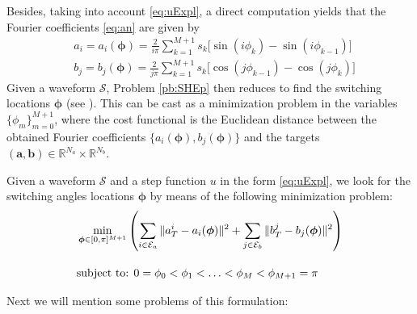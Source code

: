 Besides, taking into account \eqref{eq:uExpl}, a direct computation yields that the Fourier coefficients \eqref{eq:an} are given by
\begin{align*}
	& a_i = a_i(\bm{\phi}) =  \frac{2}{i\pi} \sum_{k=1}^{M+1} s_k \Big[\sin(i\phi_k) -\sin(i\phi_{k-1})\Big]
	\\
	& b_j = b_j(\bm{\phi}) = \frac{2}{j\pi} \sum_{k=1}^{M+1} s_k \Big[\cos(j\phi_{k-1}) -\cos(j\phi_{k})\Big]
\end{align*}
Given a waveform $\mathcal S$, Problem \ref{pb:SHEp} then reduces to find the switching locations $\bm{\phi}$ (see \cite{Yang2015,Konstantinou2010,Sun1996}). This can be cast as a minimization problem in the variables $\{\phi_m\}_{m=0}^{M+1}$, where the cost functional is the Euclidean distance between the obtained Fourier coefficients $\{a_i(\bm{\phi}),b_j(\bm{\phi})\}$ and the targets $(\bm{a},\bm{b})\in \mathbb{R}^{N_a}\times \mathbb{R}^{N_b}$.
\newline
\begin{problem}
Given a waveform $\mathcal S$ and a step function $u$ in the form \eqref{eq:uExpl}, we look for the switching angles locations $\bm{\phi}$ by means of the following minimization problem:
\begin{align}
	&\min_{\bm{\phi} \in [0,\pi]^{M+1}} \left(\sum_{i\in\mathcal{E}_a} \|a_T^i - a_i(\bm{\phi})\|^2 + \sum_{j\in \mathcal{E}_b} \|b_T^j - b_j(\bm{\phi})\|^2\right)\notag 
	\\[10pt]
	&\mbox{subject to: } 0 = \phi_0 <\phi_1 < \ldots < \phi_{M} < \phi_{M+1} = \pi \notag 
\end{align}
\end{problem}
Next we will mention some problems of this formulation:
